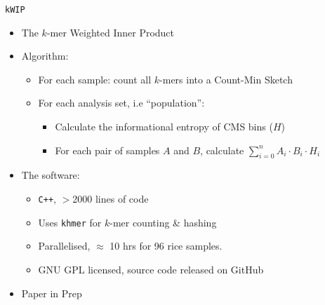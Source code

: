 \documentclass[t]{beamer}
\begin{document}
\begin{frame}{\texttt{kWIP}}
  \begin{itemize}
    \item The $k$-mer Weighted Inner Product
    \pause
    \item Algorithm:
      \begin{itemize}
        \item For each sample: count all $k$-mers into a Count-Min Sketch
        \pause
        \item For each analysis set, i.e ``population'':
          \begin{itemize}
            \item Calculate the informational entropy of CMS bins ($H$)
            \item For each pair of samples $A$ and $B$, calculate
              $\sum^{n}_{i=0} A_i \cdot B_i \cdot H_i$
          \end{itemize}
      \end{itemize}
    \pause
    \item The software:
      \begin{itemize}
        \item \texttt{C++}, $>$2000 lines of code
        \item Uses \texttt{khmer} for $k$-mer counting \& hashing
        \item Parallelised, $\approx$ 10 hrs for 96 rice samples.
        \item GNU GPL licensed, source code released on GitHub
      \end{itemize}
    \item Paper in Prep
  \end{itemize}
\end{frame}
\end{document}

